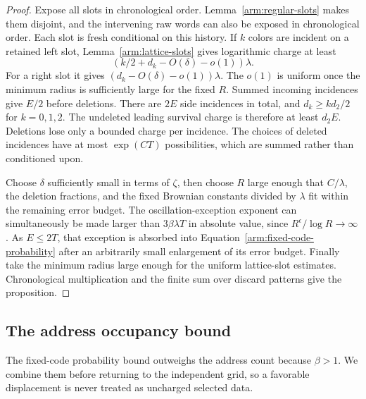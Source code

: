\begin{proof}
Expose all slots in chronological order.  Lemma~\ref{arm:regular-slots}
makes them disjoint, and the intervening raw words can also be
exposed in chronological order.  Each slot is fresh conditional on
this history.  If $k$ colors are incident on a retained left slot,
Lemma~\ref{arm:lattice-slots} gives logarithmic charge at least
\[
 (k/2+d_k-O(\delta)-o(1))\lambda.
\]
For a right slot it gives
$(d_k-O(\delta)-o(1))\lambda$.  The $o(1)$ is uniform once the
minimum radius is sufficiently large for the fixed $R$.
Summed incoming incidences give $E/2$ before deletions.  There are
$2E$ side incidences in total, and
$d_k\ge k d_2/2$ for $k=0,1,2$.  The undeleted leading survival
charge is therefore at least $d_2E$.  Deletions lose only a bounded
charge per incidence.  The choices of deleted incidences have at
most $\exp(CT)$ possibilities, which are summed rather than
conditioned upon.

Choose $\delta$ sufficiently small in terms of $\zeta$, then choose
$R$ large enough that $C/\lambda$, the deletion fractions, and the
fixed Brownian constants divided by $\lambda$ fit within the
remaining error budget.  The oscillation-exception exponent can
simultaneously be made larger than $3\beta\lambda T$ in absolute
value, since $R^\epsilon/\log R\to\infty$.  As $E\le2T$, that
exception is absorbed into Equation~\eqref{arm:fixed-code-probability}
after an arbitrarily small enlargement of its error budget.  Finally
take the minimum radius large enough for the uniform lattice-slot
estimates.  Chronological multiplication and the finite sum over
discard patterns give the proposition.
\end{proof}


\subsection{The address occupancy bound}

The fixed-code probability bound outweighs the address count because
$\beta>1$.  We combine them before returning to the independent grid,
so a favorable displacement is never treated as uncharged selected data.

